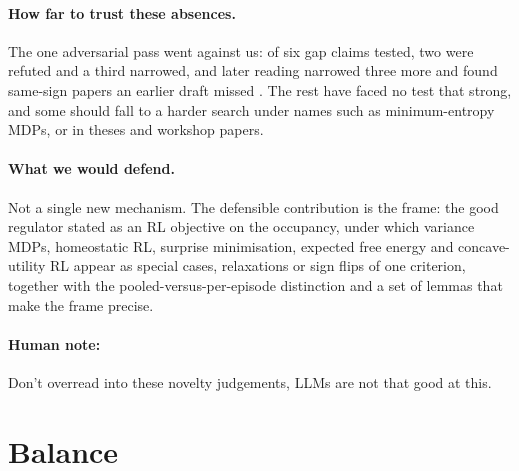\documentclass[10pt]{article}
\begin{document}
\paragraph{How far to trust these absences.}
The one adversarial pass went against us: of six gap claims tested, two were refuted and a third narrowed, and later reading narrowed three more and found same-sign papers an earlier draft missed \citep{Friston-free12c,Csaky-prediction26,Grasso-selection23}. The rest have faced no test that strong, and some should fall to a harder search under names such as minimum-entropy MDPs, or in theses and workshop papers.

\paragraph{What we would defend.}
Not a single new mechanism. The defensible contribution is the frame: the good regulator stated as an RL objective on the occupancy, under which variance MDPs, homeostatic RL, surprise minimisation, expected free energy and concave-utility RL appear as special cases, relaxations or sign flips of one criterion, together with the pooled-versus-per-episode distinction and a set of lemmas that make the frame precise.

\paragraph{Human note: } Don't overread into these novelty judgements, LLMs are not that good at this.


\section{Balance}
\end{document}
